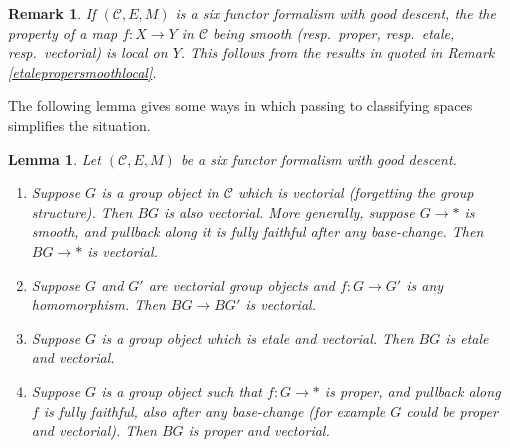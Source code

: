 \documentclass[12pt]{article}
\newtheorem{lemma}[theorem]{Lemma}
\newtheorem{remark}[theorem]{Remark}
\newcommand{\mc}{\mathcal}
\begin{document}
\begin{remark}
If $(\mc{C},E,M)$ is a six functor formalism with good descent, the the property of a map $f:X\to Y$ in $\mc{C}$ being smooth (resp.\ proper, resp.\ etale, resp.\ vectorial) is local on $Y$.  This follows from the results in \cite{HeyerSixFunctors} quoted in Remark \ref{etalepropersmoothlocal}.
\end{remark}

The following lemma gives some ways in which passing to classifying spaces simplifies the situation.

\begin{lemma}\label{bvectorial}
Let $(\mc{C},E,M)$ be a six functor formalism with good descent.
\begin{enumerate}
\item Suppose $G$ is a group object in $\mathcal{C}$ which is vectorial (forgetting the group structure).  Then $BG$ is also vectorial.  More generally, suppose $G\to \ast$ is smooth, and pullback along it is fully faithful after any base-change.  Then $BG\to \ast$ is vectorial.
\item Suppose $G$ and $G'$ are vectorial group objects and $f:G\to G'$ is any homomorphism.  Then $BG\to BG'$ is vectorial.
\item Suppose $G$ is a group object which is etale and vectorial.  Then $BG$ is etale and vectorial.
\item Suppose $G$ is a group object such that $f:G\to \ast$ is proper, and pullback along $f$ is fully faithful, also after any base-change (for example $G$ could be proper and vectorial).  Then $BG$ is proper and vectorial.
\end{enumerate}
\end{lemma}
\end{document}
